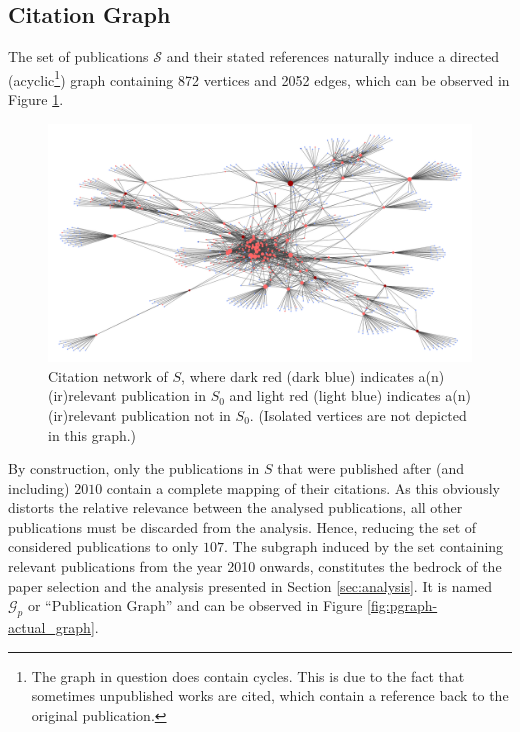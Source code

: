 \documentclass[11pt,a4paper]{book}
\theoremstyle{definition}
\theoremstyle{definition}
\theoremstyle{definition}
\theoremstyle{remark}
\newcommand{\tpset}{\mathcal{S}}
\newcommand{\pset}{S}
\newcommand{\psetz}{S_{\mathit{0}}}
\newcommand{\pgraph}{\mathcal{G}_{p}}
\begin{document}
\subsection{Citation Graph}
The set of publications $\tpset$ and their stated references naturally induce a directed (acyclic\footnote{The graph in question does contain cycles. This is due to the fact that sometimes unpublished works are cited, which contain a reference back to the original publication.}) graph containing 872 vertices and 2052 edges, which can be observed in Figure \ref{fig:pgraph-whole_graph}.


\begin{figure}[h]
\includegraphics[width=\textwidth]{whole_graph.png}
\caption{Citation network of $\pset$, where \textcolor{start_relevant}{dark red}  (\textcolor{start_nrelevant}{dark blue}) indicates a(n) (ir)relevant publication in $\psetz$ and \textcolor{other_relevant}{light red}  (\textcolor{other_nrelevant}{light blue}) indicates a(n) (ir)relevant publication not in $\psetz$. (Isolated vertices are not depicted in this graph.)}
\label{fig:pgraph-whole_graph}
\end{figure}

By construction, only the publications in $\pset$ that were published after (and including) $2010$ contain a complete mapping of their citations. As this obviously distorts the relative relevance between the analysed publications, all other publications must be discarded from the analysis. Hence, reducing the set of considered publications to only $107$. The subgraph induced by the set containing relevant publications from the year 2010 onwards, constitutes the bedrock of the paper selection and the analysis presented in Section \ref{sec:analysis}. It is named $\pgraph$ or ``Publication Graph'' and can be observed in Figure \ref{fig:pgraph-actual_graph}. 
\end{document}
